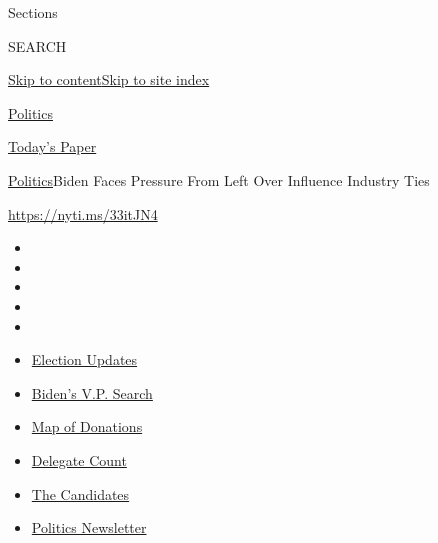 Sections

SEARCH

\protect\hyperlink{site-content}{Skip to
content}\protect\hyperlink{site-index}{Skip to site index}

\href{https://www.nytimes3xbfgragh.onion/section/politics}{Politics}

\href{https://myaccount.nytimes3xbfgragh.onion/auth/login?response_type=cookie\&client_id=vi}{}

\href{https://www.nytimes3xbfgragh.onion/section/todayspaper}{Today's
Paper}

\href{/section/politics}{Politics}\textbar{}Biden Faces Pressure From
Left Over Influence Industry Ties

\url{https://nyti.ms/33itJN4}

\begin{itemize}
\item
\item
\item
\item
\item
\end{itemize}

\begin{itemize}
\item
  \href{https://www.nytimes3xbfgragh.onion/2020/07/31/us/elections/biden-vs-trump.html?action=click\&pgtype=Article\&state=default\&region=TOP_BANNER\&context=storylines_menu}{Election
  Updates}
\item
  \href{https://www.nytimes3xbfgragh.onion/article/biden-vice-president-2020.html?action=click\&pgtype=Article\&state=default\&region=TOP_BANNER\&context=storylines_menu}{Biden's
  V.P. Search}
\item
  \href{https://www.nytimes3xbfgragh.onion/interactive/2020/07/24/us/politics/trump-biden-campaign-donors.html?action=click\&pgtype=Article\&state=default\&region=TOP_BANNER\&context=storylines_menu}{Map
  of Donations}
\item
  \href{https://www.nytimes3xbfgragh.onion/interactive/2020/us/elections/delegate-count-primary-results.html?action=click\&pgtype=Article\&state=default\&region=TOP_BANNER\&context=storylines_menu}{Delegate
  Count}
\item
  \href{https://www.nytimes3xbfgragh.onion/interactive/2019/us/politics/2020-presidential-candidates.html?action=click\&pgtype=Article\&state=default\&region=TOP_BANNER\&context=storylines_menu}{The
  Candidates}
\item
  \href{https://www.nytimes3xbfgragh.onion/newsletters/politics?action=click\&pgtype=Article\&state=default\&region=TOP_BANNER\&context=storylines_menu}{Politics
  Newsletter}
\end{itemize}

